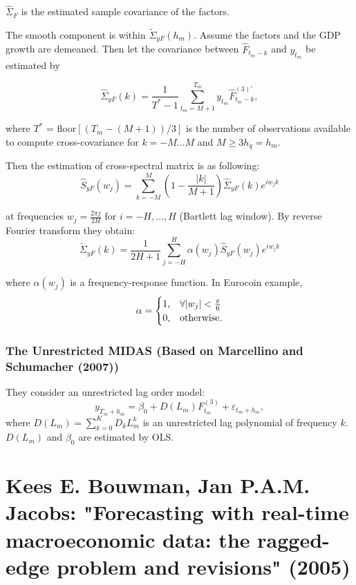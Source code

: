 \documentclass[8pt, a4paper, twocolumn, landscape]{extarticle}
\begin{document}
	$\hat{\Sigma}_F$ is the estimated sample covariance of the factors.
	\medskip
	
	The smooth component is within $\tilde{\Sigma}_{yF}(h_m)$. Assume the factors and the GDP growth are demeaned. Then let the covariance between $\hat{F}_{t_m-k}$ and $y_{t_m}$ be estimated by
	
	\[
	\hat{\Sigma}_{yF}(k) = \frac{1}{T^* - 1}\sum_{t_m = M + 1}^{T_m} y_{t_m} \hat{F}_{t_m - k}^{(3)'},
	\]
	
	where $T^*$ = floor$[(T_m - (M+1))/3]$ is the number of observations available to compute cross-covariance for $k = -M \dots M$ and $M \ge 3h_q = h_m$.
	
	Then the estimation of cross-spectral matrix is as following:
	\[
	\hat{S}_{yF}(w_j) = \sum_{k = -M}^{M} \left( 1 - \frac{|k|}{M + 1} \right) \hat{\Sigma}_{yF}(k)e^{iw_jk}
	\]
	
	at frequencies $w_j = \frac{2\pi j}{2H}$ for $i = -H, \dots, H$ (Bartlett lag window). By reverse Fourier transform they obtain:
	\[
	\tilde{\Sigma}_{yF}(k) = \frac{1}{2H + 1} \sum_{j = -H}^{H} \alpha (w_j) \hat{S}_{yF}(w_j)e^{iw_jk}
	\]
	
	where $\alpha(w_j)$ is a frequency-response function. In Eurocoin example,
	\[
	\alpha = \begin{cases}
	1, & \forall |w_j| < \frac{\pi}{6} \\
	0, & \textnormal{otherwise}.
	\end{cases}
	\]
	
	\subsubsection{The Unrestricted MIDAS (Based on Marcellino and Schumacher (2007))}
	
	They consider an unrestricted lag order model:
	\[
	y_{T_m + h_m} = \beta_0 + D(L_m)F_{t_m}^{(3)} + \varepsilon_{t_m + h_m},
	\]
	where $D(L_m) = \sum_{k = 0}^{K}D_kL_m^k$ is an unrestricted lag polynomial of frequency $k$. $D(L_m)$ and $\beta_0$ are estimated by OLS.
	
	
	\section{Kees E. Bouwman, Jan P.A.M. Jacobs: "Forecasting with real-time macroeconomic data: the ragged-edge problem and revisions" (2005)}
	
\end{document}
